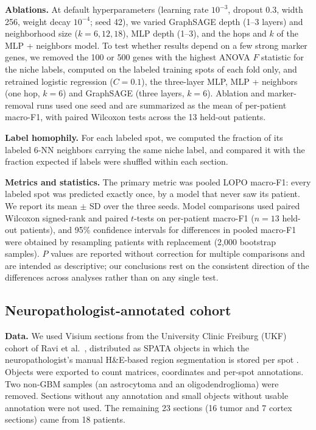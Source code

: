 \documentclass[11pt,letterpaper]{article}
\begin{document}
\textbf{Ablations.} At default hyperparameters (learning rate $10^{-3}$, dropout 0.3, width 256, weight decay $10^{-4}$; seed 42), we varied GraphSAGE depth (1--3 layers) and neighborhood size ($k = 6, 12, 18$), MLP depth (1--3), and the hops and $k$ of the MLP + neighbors model. To test whether results depend on a few strong marker genes, we removed the 100 or 500 genes with the highest ANOVA $F$ statistic for the niche labels, computed on the labeled training spots of each fold only, and retrained logistic regression ($C = 0.1$), the three-layer MLP, MLP + neighbors (one hop, $k = 6$) and GraphSAGE (three layers, $k = 6$). Ablation and marker-removal runs used one seed and are summarized as the mean of per-patient macro-F1, with paired Wilcoxon tests across the 13 held-out patients.

\textbf{Label homophily.} For each labeled spot, we computed the fraction of its labeled 6-NN neighbors carrying the same niche label, and compared it with the fraction expected if labels were shuffled within each section.

\textbf{Metrics and statistics.} The primary metric was pooled LOPO macro-F1: every labeled spot was predicted exactly once, by a model that never saw its patient. We report its mean $\pm$ SD over the three seeds. Model comparisons used paired Wilcoxon signed-rank and paired $t$-tests on per-patient macro-F1 ($n = 13$ held-out patients), and 95\% confidence intervals for differences in pooled macro-F1 were obtained by resampling patients with replacement (2{,}000 bootstrap samples). $P$ values are reported without correction for multiple comparisons and are intended as descriptive; our conclusions rest on the consistent direction of the differences across analyses rather than on any single test.

\subsection{Neuropathologist-annotated cohort}

\textbf{Data.} We used Visium sections from the University Clinic Freiburg (UKF) cohort of Ravi et al.\ \cite{ravi2022}, distributed as SPATA objects in which the neuropathologist's manual H\&E-based region segmentation is stored per spot \cite{ritter2025}. Objects were exported to count matrices, coordinates and per-spot annotations. Two non-GBM samples (an astrocytoma and an oligodendroglioma) were removed. Sections without any annotation and small objects without usable annotation were not used. The remaining 23 sections (16 tumor and 7 cortex sections) came from 18 patients.
\end{document}
